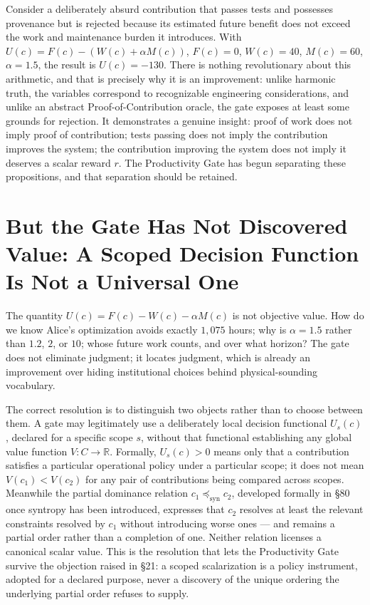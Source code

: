 \documentclass[12pt]{article}
\begin{document}
Consider a deliberately absurd contribution that passes tests and possesses provenance but is rejected because its estimated future benefit does not exceed the work and maintenance burden it introduces. With $U(c)=F(c)-(W(c)+\alpha M(c))$, $F(c)=0$, $W(c)=40$, $M(c)=60$, $\alpha=1.5$, the result is $U(c)=-130$. There is nothing revolutionary about this arithmetic, and that is precisely why it is an improvement: unlike harmonic truth, the variables correspond to recognizable engineering considerations, and unlike an abstract Proof-of-Contribution oracle, the gate exposes at least some grounds for rejection. It demonstrates a genuine insight: proof of work does not imply proof of contribution; tests passing does not imply the contribution improves the system; the contribution improving the system does not imply it deserves a scalar reward $r$. The Productivity Gate has begun separating these propositions, and that separation should be retained.

\section{But the Gate Has Not Discovered Value: A Scoped Decision Function Is Not a Universal One}

The quantity $U(c)=F(c)-W(c)-\alpha M(c)$ is not objective value. How do we know Alice's optimization avoids exactly $1{,}075$ hours; why is $\alpha=1.5$ rather than $1.2$, $2$, or $10$; whose future work counts, and over what horizon? The gate does not eliminate judgment; it locates judgment, which is already an improvement over hiding institutional choices behind physical-sounding vocabulary.

The correct resolution is to distinguish two objects rather than to choose between them. A gate may legitimately use a deliberately local decision functional $U_s(c)$, declared for a specific scope $s$, without that functional establishing any global value function $V:C\to\mathbb{R}$. Formally, $U_s(c)>0$ means only that a contribution satisfies a particular operational policy under a particular scope; it does not mean $V(c_1)<V(c_2)$ for any pair of contributions being compared across scopes. Meanwhile the partial dominance relation $c_1\preceq_{\mathrm{syn}}c_2$, developed formally in \S80 once syntropy has been introduced, expresses that $c_2$ resolves at least the relevant constraints resolved by $c_1$ without introducing worse ones — and remains a partial order rather than a completion of one. Neither relation licenses a canonical scalar value. This is the resolution that lets the Productivity Gate survive the objection raised in \S21: a scoped scalarization is a policy instrument, adopted for a declared purpose, never a discovery of the unique ordering the underlying partial order refuses to supply.
\end{document}
